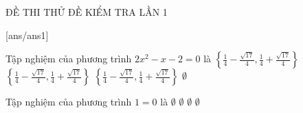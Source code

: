 \begin{name}
{ĐỀ THI THỬ}
{ĐỀ KIỂM TRA LẦN 1}
\end{name}
[ans/ans1]
\begin{ex}
Tập nghiệm của phương trình $2 x^{2} - x - 2=0$ là
\choice
{$\left\{\frac{1}{4} - \frac{\sqrt{17}}{4}, \frac{1}{4} + \frac{\sqrt{17}}{4}\right\}$}
{$\left\{\frac{1}{4} - \frac{\sqrt{17}}{4}, \frac{1}{4} + \frac{\sqrt{17}}{4}\right\}$}
{$\left\{\frac{1}{4} - \frac{\sqrt{17}}{4}, \frac{1}{4} + \frac{\sqrt{17}}{4}\right\}$}
{$\emptyset$}
\end{ex}
\begin{ex}
Tập nghiệm của phương trình $1=0$ là
\choice
{$\emptyset$}
{$\emptyset$}
{$\emptyset$}
{$\emptyset$}
\end{ex}
